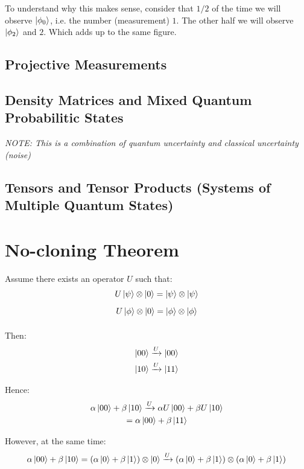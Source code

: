 \documentclass{article}
\newcommand{\tens}[1]{%
  \mathbin{\mathop{\otimes}\limits_{#1}}%
}
\begin{document}
To understand why this makes sense, consider that $1/2$ of the time we will observe $\ket{\phi_0}$, i.e. the number (measurement) $1$. The other half we will observe $\ket{\phi_2}$ and $2$. Which adds up to the same figure.

\subsection{Projective Measurements}
\subsection{Density Matrices and Mixed Quantum Probabilitic States}
\textit{NOTE: This is a combination of quantum uncertainty and classical uncertainty (noise)}
\subsection{Tensors and Tensor Products (Systems of Multiple Quantum States)}

\section{No-cloning Theorem}
Assume there exists an operator $U$ such that:
\begin{gather*}
    U \ket{\psi} \tens{} \ket{0} = \ket{\psi} \tens{} \ket{\psi} \\
    U \ket{\phi} \tens{} \ket{0} = \ket{\phi} \tens{} \ket{\phi}
\end{gather*}

Then:
\begin{gather*}
    \ket{00} \xrightarrow{U} \ket{00} \\
    \ket{10} \xrightarrow{U} \ket{11}
\end{gather*}

Hence:
\begin{gather*}
    \alpha \ket{00} + \beta \ket{10} \xrightarrow{U} 
        \alpha U \ket{00} + \beta U \ket{10} \\
        = \alpha \ket{00} + \beta \ket{11}
\end{gather*}

However, at the same time:
\begin{gather*}
    \alpha \ket{00} + \beta \ket{10} = (\alpha \ket{0} + \beta \ket{1}) \tens{} \ket{0} \xrightarrow{U}
        (\alpha \ket{0} + \beta \ket{1}) \tens{} (\alpha \ket{0} + \beta \ket{1})
\end{gather*}
\end{document}
